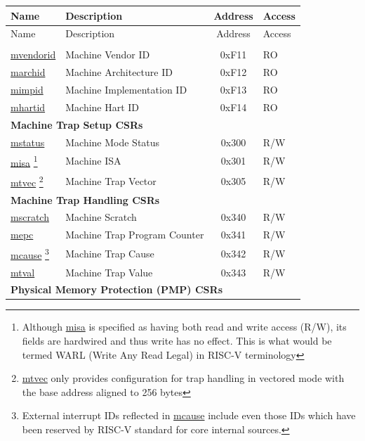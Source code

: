 
\begin{longtable}{ | p{4.0cm} | p{8.4cm} | c | l | }
\hline\rowcolor{lightgray}
Name & Description & Address & Access \\ \hline
\endfirsthead
\hline
\rowcolor{lightgray}
Name & Description & Address & Access \\
\hline
\endhead
\endfoot

\multicolumn{4}{|l|}{\textbf{Machine Information CSRs}} \\\hline
\hyperref[regdesc:MVENDORID]{mvendorid} & Machine Vendor ID & 0xF11 & RO \\\hline
\hyperref[regdesc:MARCHID]{marchid} & Machine Architecture ID & 0xF12 & RO \\\hline
\hyperref[regdesc:MIMPID]{mimpid} & Machine Implementation ID & 0xF13 & RO \\\hline
\hyperref[regdesc:MHARTID]{mhartid} & Machine Hart ID & 0xF14 & RO \\\hline
\multicolumn{4}{|l|}{\textbf{Machine Trap Setup CSRs}} \\\hline
\hyperref[regdesc:MSTATUS]{mstatus} & Machine Mode Status & 0x300 & R/W \\\hline
\hyperref[regdesc:MISA]{misa} \footnote{Although \hyperref[regdesc:MISA]{misa} is specified as having both read and write access (R/W), its fields are hardwired and thus write has no effect. This is what would be termed WARL (Write Any Read Legal) in RISC-V terminology} & Machine ISA & 0x301 & R/W \\\hline
\hyperref[regdesc:MTVEC]{mtvec} \footnote{\hyperref[regdesc:MTVEC]{mtvec} only provides configuration for trap handling in vectored mode with the base address aligned to 256 bytes} & Machine Trap Vector & 0x305 & R/W \\\hline
\multicolumn{4}{|l|}{\textbf{Machine Trap Handling CSRs}} \\\hline
\hyperref[regdesc:MSCRATCH]{mscratch} & Machine Scratch & 0x340 & R/W \\\hline
\hyperref[regdesc:MEPC]{mepc} & Machine Trap Program Counter & 0x341 & R/W \\\hline
\hyperref[regdesc:MCAUSE]{mcause} \footnote{External interrupt IDs reflected in \hyperref[regdesc:MCAUSE]{mcause} include even those IDs which have been reserved by RISC-V standard for core internal sources.} & Machine Trap Cause & 0x342 & R/W \\\hline
\hyperref[regdesc:MTVAL]{mtval} & Machine Trap Value & 0x343 & R/W \\\hline
\multicolumn{4}{|l|}{\textbf{Physical Memory Protection (PMP) CSRs}} \\\hline

\end{longtable}

